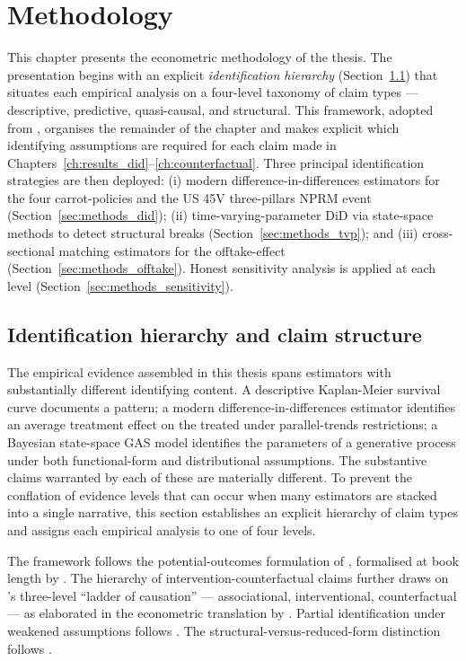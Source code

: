 \chapter{Methodology}
\label{ch:methodology}

This chapter presents the econometric methodology of the thesis. The presentation begins with an explicit \emph{identification hierarchy} (Section~\ref{sec:methods_identification_hierarchy}) that situates each empirical analysis on a four-level taxonomy of claim types --- descriptive, predictive, quasi-causal, and structural. This framework, adopted from \cite{imbens2015causal, pearl2009causality}, organises the remainder of the chapter and makes explicit which identifying assumptions are required for each claim made in Chapters~\ref{ch:results_did}--\ref{ch:counterfactual}. Three principal identification strategies are then deployed: (i) modern difference-in-differences estimators for the four carrot-policies and the US 45V three-pillars NPRM event (Section~\ref{sec:methods_did}); (ii) time-varying-parameter DiD via state-space methods to detect structural breaks (Section~\ref{sec:methods_tvp}); and (iii) cross-sectional matching estimators for the offtake-effect (Section~\ref{sec:methods_offtake}). Honest sensitivity analysis is applied at each level (Section~\ref{sec:methods_sensitivity}).

\section{Identification hierarchy and claim structure}
\label{sec:methods_identification_hierarchy}

The empirical evidence assembled in this thesis spans estimators with substantially different identifying content. A descriptive Kaplan-Meier survival curve documents a pattern; a modern difference-in-differences estimator identifies an average treatment effect on the treated under parallel-trends restrictions; a Bayesian state-space GAS model identifies the parameters of a generative process under both functional-form and distributional assumptions. The substantive claims warranted by each of these are materially different. To prevent the conflation of evidence levels that can occur when many estimators are stacked into a single narrative, this section establishes an explicit hierarchy of claim types and assigns each empirical analysis to one of four levels.

The framework follows the potential-outcomes formulation of \cite{rubin1974estimating, holland1986statistics}, formalised at book length by \cite{imbens2015causal}. The hierarchy of intervention-counterfactual claims further draws on \cite{pearl2009causality}'s three-level ``ladder of causation'' --- associational, interventional, counterfactual --- as elaborated in the econometric translation by \cite{imbens2020potential}. Partial identification under weakened assumptions follows \cite{manski2003partial}. The structural-versus-reduced-form distinction follows \cite{heckman2007econometric}.

